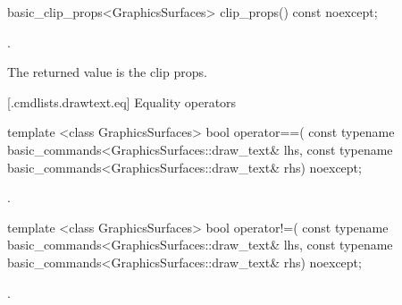 %
\begin{itemdecl}
basic_clip_props<GraphicsSurfaces> clip_props() const noexcept;
\end{itemdecl}
\begin{itemdescr}
\pnum
\returns {}.

\pnum
\remarks The returned value is the clip props.
\end{itemdescr}

 [\iotwod.cmdlists.drawtext.eq] {Equality operators}%

%
\begin{itemdecl}
template <class GraphicsSurfaces>
bool operator==(
  const typename basic_commands<GraphicsSurfaces::draw_text& lhs,
  const typename basic_commands<GraphicsSurfaces::draw_text& rhs) 
  noexcept;
\end{itemdecl}
\begin{itemdescr}
\pnum
\returns {}.
\end{itemdescr}

%
\begin{itemdecl}
template <class GraphicsSurfaces>
bool operator!=(
  const typename basic_commands<GraphicsSurfaces::draw_text& lhs,
  const typename basic_commands<GraphicsSurfaces::draw_text& rhs) 
  noexcept;
\end{itemdecl}
\begin{itemdescr}
\pnum
\returns {}.
\end{itemdescr}
